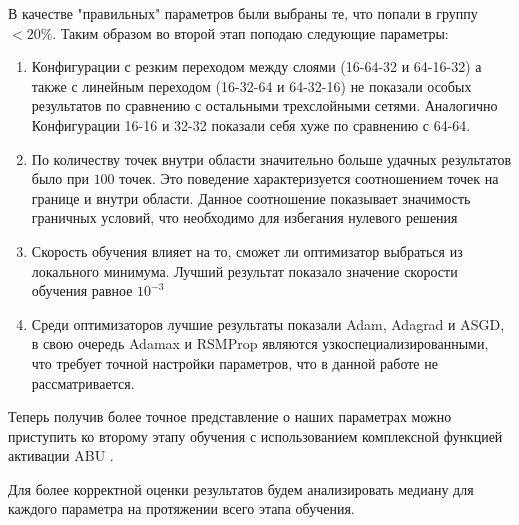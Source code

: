 В качестве "правильных" параметров были выбраны те, что попали в группу $< 20\%$.
Таким образом во второй этап поподаю следующие параметры:
\begin{enumerate}
    \item Конфигурации с резким переходом между слоями (16-64-32 и 64-16-32) а также
    с линейным переходом (16-32-64 и 64-32-16) не показали особых результатов по
    сравнению с остальными трехслойными сетями. Аналогично Конфигурации
    16-16 и 32-32 показали себя хуже по сравнению с 64-64.
    \item По количеству точек внутри области значительно больше удачных
    результатов было при $100$ точек. Это поведение характеризуется 
    соотношением точек на границе и внутри области. Данное соотношение 
    показывает значимость граничных условий, что необходимо для избегания
    нулевого решения
    \item Скорость обучения влияет на то, сможет ли оптимизатор 
    выбраться из локального минимума. Лучший результат показало значение
    скорости обучения равное $10^{-3}$
    \item Среди оптимизаторов лучшие результаты показали Adam, Adagrad и
    ASGD, в свою очередь Adamax и RSMProp являются узкоспециализированными,
    что требует точной настройки параметров, что в данной работе не рассматривается.
\end{enumerate} 

Теперь получив более точное представление о наших параметрах можно приступить
ко второму этапу обучения с использованием комплексной функцией активации ABU \cite{Sutfeld2018-io}.

Для более корректной оценки результатов будем анализировать медиану для каждого параметра
на протяжении всего этапа обучения.

% 
% 
% 
% 
% 